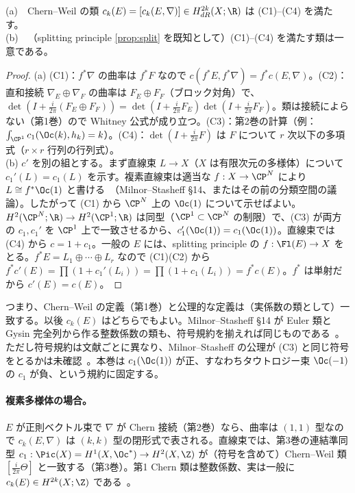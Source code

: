 \begin{thm}[存在と一意性]\label{thm:chernexist}
(a)\ \tP\ Chern--Weil の類 $c_k(E)=[c_k(E,\nabla)]\in H^{2k}_{dR}(X;\R)$ は (C1)--(C4) を満たす。\\
(b)\ \tP\ （splitting principle \ref{prop:split} を既知として）(C1)--(C4) を満たす類は一意である。
\end{thm}
\begin{proof}
(a) (C1)：$f^*\nabla$ の曲率は $f^*F$ なので $c(f^*E,f^*\nabla)=f^*c(E,\nabla)$。(C2)：直和接続 $\nabla_E\oplus\nabla_F$ の曲率は $F_E\oplus F_F$（ブロック対角）で、$\det(I+\frac i{2\pi}(F_E\oplus F_F))=\det(I+\frac i{2\pi}F_E)\det(I+\frac i{2\pi}F_F)$。類は接続によらない（第1巻）ので Whitney 公式が成り立つ。(C3)：第2巻の計算（例：$\int_{\CP^1}c_1(\Oc(k),h_k)=k$）。(C4)：$\det(I+\frac i{2\pi}F)$ は $F$ について $r$ 次以下の多項式（$r\times r$ 行列の行列式）。\\
(b) $c'$ を別の組とする。まず直線束 $L\to X$（$X$ は有限次元の多様体）について $c_1'(L)=c_1(L)$ を示す。複素直線束は適当な $f:X\to\CP^N$ により $L\cong f^*\Oc(1)$ と書ける\tC\ （Milnor--Stasheff §14、またはその前の分類空間の議論）。したがって (C1) から $\CP^N$ 上の $\Oc(1)$ について示せばよい。$H^2(\CP^N;\R)\to H^2(\CP^1;\R)$ は同型（$\CP^1\subset\CP^N$ の制限）で、(C3) が両方の $c_1,c_1'$ を $\CP^1$ 上で一致させるから、$c_1'(\Oc(1))=c_1(\Oc(1))$。直線束では (C4) から $c=1+c_1$。一般の $E$ には、splitting principle の $f:\Fl(E)\to X$ をとる。$f^*E=L_1\oplus\cdots\oplus L_r$ なので (C1)(C2) から $f^*c'(E)=\prod(1+c_1'(L_i))=\prod(1+c_1(L_i))=f^*c(E)$。$f^*$ は単射だから $c'(E)=c(E)$。
\end{proof}
\noindent つまり、Chern--Weil の定義（第1巻）と公理的な定義は（実係数の類として）一致する。以後 $c_k(E)$ はどちらでもよい。Milnor--Stasheff §14 が Euler 類と Gysin 完全列から作る整数係数の類も、符号規約を揃えれば同じものである\tC\ 。ただし符号規約は文献ごとに異なり、Milnor--Stasheff の公理が (C3) と同じ符号をとるかは未確認\tQ\ 。本巻は $c_1(\Oc(1))$ が正、すなわちタウトロジー束 $\Oc(-1)$ の $c_1$ が負、という規約に固定する。

\paragraph{複素多様体の場合。}$E$ が正則ベクトル束で $\nabla$ が Chern 接続（第2巻）なら、曲率は $(1,1)$ 型なので $c_k(E,\nabla)$ は $(k,k)$ 型の閉形式で表される。直線束では、第3巻の連結準同型 $c_1:\Pic(X)=H^1(X,\Oc^*)\to H^2(X,\Z)$ が（符号を含めて）Chern--Weil 類 $[\frac i{2\pi}\Theta]$ と一致する（第3巻）。第1 Chern 類は整数係数、実は一般に $c_k(E)\in H^{2k}(X;\Z)$ である\tC\ 。


